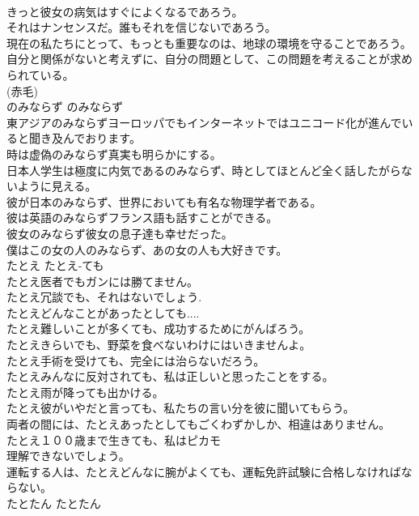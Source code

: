 \documentclass[8pt]{extreport}
\begin{document}
\begin{CJK}{UTF8}{min}
\\	きっと彼女の病気はすぐによくなるであろう。  
\\	それはナンセンスだ。誰もそれを信じないであろう。  
\\	現在の私たちにとって、もっとも重要なのは、地球の環境を守ることであろう。自分と関係がないと考えずに、自分の問題として、この問題を考えることが求められている。  
\\	(赤毛)
\\	のみならず	のみならず	
\\	東アジアのみならずヨーロッパでもインターネットではユニコード化が進んでいると聞き及んでおります。  
\\	時は虚偽のみならず真実も明らかにする。  
\\	日本人学生は極度に内気であるのみならず、時としてほとんど全く話したがらないように見える。   
\\	彼が日本のみならず、世界においても有名な物理学者である。   
\\	彼は英語のみならずフランス語も話すことができる。   
\\	彼女のみならず彼女の息子達も幸せだった。   
\\	僕はこの女の人のみならず、あの女の人も大好きです。  
\\	たとえ	たとえ-ても	
\\	たとえ医者でもガンには勝てません。  
\\	たとえ冗談でも、それはないでしょう.  
\\	たとえどんなことがあったとしても....  
\\	たとえ難しいことが多くても、成功するためにがんばろう。  
\\	たとえきらいでも、野菜を食べないわけにはいきませんよ。  
\\	たとえ手術を受けても、完全には治らないだろう。  
\\	たとえみんなに反対されても、私は正しいと思ったことをする。   
\\	たとえ雨が降っても出かける。  
\\	たとえ彼がいやだと言っても、私たちの言い分を彼に聞いてもらう。   
\\	両者の間には、たとえあったとしてもごくわずかしか、相違はありません。   
\\	たとえ１００歳まで生きても、私はピカモ
\\	理解できないでしょう。   
\\	運転する人は、たとえどんなに腕がよくても、運転免許試験に合格しなければならない。  
\\	たとたん	たとたん	
\\	[とたん（に）] 

\end{CJK}
\end{document}
